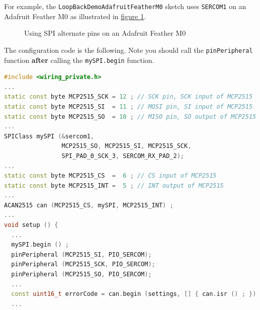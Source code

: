 \documentclass[9pt, a4paper, obeyspaces]{extarticle}
\newcommand\labelFigure[1]{\label{fig:#1}}
\newcommand\refFigure[2]{\hyperref[fig:#2]{figure \ref*{fig:#2}{\ifthenelse{\equal{#1}{}}{}{.#1}}}}
\begin{document}
For example, the \texttt{LoopBackDemoAdafruitFeatherM0} sketch uses \texttt{SERCOM1} on an Adafruit Feather M0 as illustrated in \refFigure{}{figureAdafruitFeatherM0AlternatePins}.
\begin{figure}[!ht]
  \small
  \centering
  \caption{Using SPI alternate pins on an Adafruit Feather M0}
  \labelFigure{figureAdafruitFeatherM0AlternatePins}
\end{figure}

The configuration code is the following. Note you should call the \texttt{pinPeripheral} function \textbf{after} calling the \texttt{mySPI.begin} function.
{ \small\begin{lstlisting}[language=c++]
#include <wiring_private.h>
...
static const byte MCP2515_SCK = 12 ; // SCK pin, SCK input of MCP2515 
static const byte MCP2515_SI  = 11 ; // MOSI pin, SI input of MCP2515  
static const byte MCP2515_SO  = 10 ; // MISO pin, SO output of MCP2515 
...
SPIClass mySPI (&sercom1,
                MCP2515_SO, MCP2515_SI, MCP2515_SCK,
                SPI_PAD_0_SCK_3, SERCOM_RX_PAD_2);
...
static const byte MCP2515_CS  =  6 ; // CS input of MCP2515 
static const byte MCP2515_INT =  5 ; // INT output of MCP2515
...
ACAN2515 can (MCP2515_CS, mySPI, MCP2515_INT) ;
...
void setup () {
  ...
  mySPI.begin () ;
  pinPeripheral (MCP2515_SI, PIO_SERCOM);
  pinPeripheral (MCP2515_SCK, PIO_SERCOM);
  pinPeripheral (MCP2515_SO, PIO_SERCOM);
  ...
  const uint16_t errorCode = can.begin (settings, [] { can.isr () ; }) ;
  ...
\end{lstlisting}}
\end{document}
